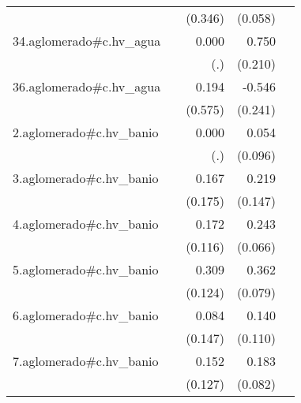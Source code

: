 {\begin{longtable}{l*{4}{D{.}{.}{-1}}}
            &                     &     (0.346)         &     (0.058)         &                     \\
\addlinespace
34.aglomerado#c.hv\_agua&                     &       0.000         &       0.750\sym{***}&                     \\
            &                     &         (.)         &     (0.210)         &                     \\
\addlinespace
36.aglomerado#c.hv\_agua&                     &       0.194         &      -0.546\sym{*}  &                     \\
            &                     &     (0.575)         &     (0.241)         &                     \\
\addlinespace
2.aglomerado#c.hv\_banio&                     &       0.000         &       0.054         &                     \\
            &                     &         (.)         &     (0.096)         &                     \\
\addlinespace
3.aglomerado#c.hv\_banio&                     &       0.167         &       0.219         &                     \\
            &                     &     (0.175)         &     (0.147)         &                     \\
\addlinespace
4.aglomerado#c.hv\_banio&                     &       0.172         &       0.243\sym{***}&                     \\
            &                     &     (0.116)         &     (0.066)         &                     \\
\addlinespace
5.aglomerado#c.hv\_banio&                     &       0.309\sym{*}  &       0.362\sym{***}&                     \\
            &                     &     (0.124)         &     (0.079)         &                     \\
\addlinespace
6.aglomerado#c.hv\_banio&                     &       0.084         &       0.140         &                     \\
            &                     &     (0.147)         &     (0.110)         &                     \\
\addlinespace
7.aglomerado#c.hv\_banio&                     &       0.152         &       0.183\sym{*}  &                     \\
            &                     &     (0.127)         &     (0.082)         &                     \\

\end{longtable}}
